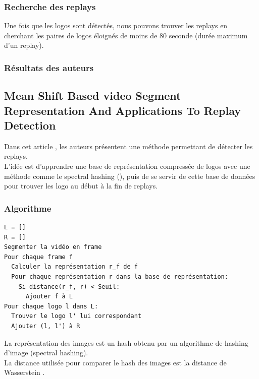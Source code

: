 \documentclass[11pt]{article}
\begin{document}
\subsubsection{Recherche des replays}
\label{sec:orgd93824c}
Une fois que les logos sont détectés, nous pouvons trouver les replays en cherchant les paires de logos éloignés de moins de 80 seconde (durée maximum d'un replay).\\

\subsubsection{Résultats des auteurs}
\label{sec:orgd6016e0}
\subsection{Mean Shift Based video Segment Representation And Applications To Replay Detection}
\label{sec:orgdb9ef6f}
Dans cet article \cite{Ling_Yu_Duan}, les auteurs présentent une méthode permettant de détecter les replays.\\
L'idée est d'apprendre une base de représentation compressée de logos avec une méthode comme le spectral hashing (\cite{NIPS2008_3383}), puis de se servir de cette base de données pour trouver les logo au début à la fin de replays.\\
\subsubsection{Algorithme}
\label{sec:orgd649ed8}
\begin{verbatim}
L = []
R = []
Segmenter la vidéo en frame
Pour chaque frame f
  Calculer la représentation r_f de f
  Pour chaque représentation r dans la base de représentation:
    Si distance(r_f, r) < Seuil:
      Ajouter f à L
Pour chaque logo l dans L:
  Trouver le logo l' lui correspondant
  Ajouter (l, l') à R
\end{verbatim}
La représentation des images est un hash obtenu par un algorithme de hashing d'image (spectral hashing).\\
La distance utilisée pour comparer le hash des images est la distance de Wasserstein .\\
\end{document}
